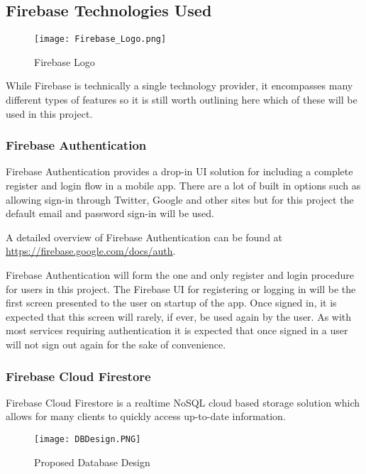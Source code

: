 \subsection{Firebase Technologies Used}
\label{section:firebasetechused}

\begin{figure}[ht]
  \centering
      \texttt{[image: Firebase\_Logo.png]}
  \caption[Firebase Logo]{Firebase Logo\cite{firebaselogo}}
  \label{fig:firebaselogo}
\end{figure}

While Firebase is technically a single technology provider, it encompasses many different types of features so it is still worth outlining here which of these will be used in this project.

\subsubsection{Firebase Authentication}

Firebase Authentication provides a drop-in UI solution for including a complete register and login flow in a mobile app. There are a lot of built in options such as allowing sign-in through Twitter, Google and other sites but for this project the default email and password sign-in will be used.

A detailed overview of Firebase Authentication can be found at \url{https://firebase.google.com/docs/auth}.

Firebase Authentication will form the one and only register and login procedure for users in this project. The Firebase UI for registering or logging in will be the first screen presented to the user on startup of the app. Once signed in, it is expected that this screen will rarely, if ever, be used again by the user. As with most services requiring authentication it is expected that once signed in a user will not sign out again for the sake of convenience.

\subsubsection{Firebase Cloud Firestore}

Firebase Cloud Firestore is a realtime NoSQL cloud based storage solution which allows for many clients to quickly access up-to-date information.

\begin{figure}[ht]
  \centering
      \texttt{[image: DBDesign.PNG]}
  \caption[Proposed Database Design]{Proposed Database Design}
  \label{fig:databasedesign}
\end{figure}

